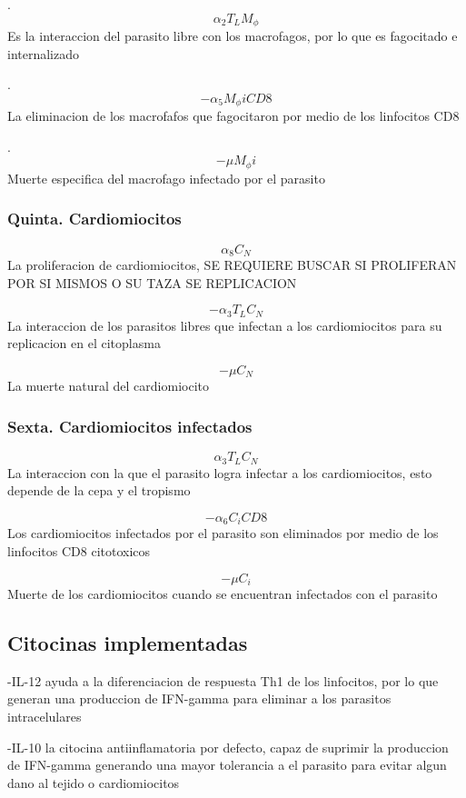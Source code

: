 \documentclass[
]{article}
\begin{document}
.\[\alpha_{2}T_{L}M_{\phi}  \] Es la interaccion del parasito libre con
los macrofagos, por lo que es fagocitado e internalizado

.\[- \alpha_{5}M_{\phi}iCD8\] La eliminacion de los macrofafos que
fagocitaron por medio de los linfocitos CD8

.\[-\mu M_{\phi}i \] Muerte especifica del macrofago infectado por el
parasito

\hypertarget{quinta.-cardiomiocitos}{%
\subsubsection{Quinta. Cardiomiocitos}\label{quinta.-cardiomiocitos}}

\[ \alpha_{8}C_{N} \] La proliferacion de cardiomiocitos, SE REQUIERE
BUSCAR SI PROLIFERAN POR SI MISMOS O SU TAZA SE REPLICACION

\[- \alpha_{3}T_{L}C_{N}\] La interaccion de los parasitos libres que
infectan a los cardiomiocitos para su replicacion en el citoplasma

\[ - \mu C_{N} \] La muerte natural del cardiomiocito

\hypertarget{sexta.-cardiomiocitos-infectados}{%
\subsubsection{Sexta. Cardiomiocitos
infectados}\label{sexta.-cardiomiocitos-infectados}}

\[ \alpha_{3}T_{L}C_{N} \] La interaccion con la que el parasito logra
infectar a los cardiomiocitos, esto depende de la cepa y el tropismo

\[ - \alpha_{6}C_{i}CD8 \] Los cardiomiocitos infectados por el parasito
son eliminados por medio de los linfocitos CD8 citotoxicos

\[- \mu C_{i} \] Muerte de los cardiomiocitos cuando se encuentran
infectados con el parasito

\hypertarget{citocinas-implementadas}{%
\subsection{Citocinas implementadas}\label{citocinas-implementadas}}

-IL-12 ayuda a la diferenciacion de respuesta Th1 de los linfocitos, por
lo que generan una produccion de IFN-gamma para eliminar a los parasitos
intracelulares

-IL-10 la citocina antiinflamatoria por defecto, capaz de suprimir la
produccion de IFN-gamma generando una mayor tolerancia a el parasito
para evitar algun dano al tejido o cardiomiocitos
\end{document}

